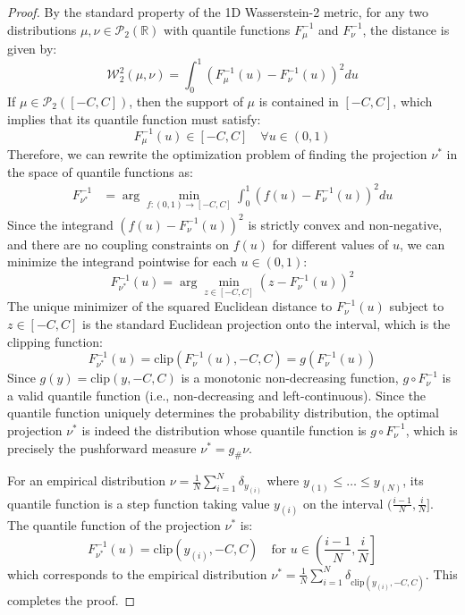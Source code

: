 \documentclass{article}
\theoremstyle{plain}
\theoremstyle{definition}
\theoremstyle{remark}
\begin{document}
\begin{proof}
By the standard property of the 1D Wasserstein-2 metric, for any two distributions $\mu, \nu \in \mathcal{P}_2(\mathbb{R})$ with quantile functions $F_{\mu}^{-1}$ and $F_{\nu}^{-1}$, the distance is given by:
\begin{equation}
    \mathcal{W}_2^2(\mu, \nu) = \int_{0}^{1} \left( F_{\mu}^{-1}(u) - F_{\nu}^{-1}(u) \right)^2 du
\end{equation}
If $\mu \in \mathcal{P}_2([-C, C])$, then the support of $\mu$ is contained in $[-C, C]$, which implies that its quantile function must satisfy:
\begin{equation}
    F_{\mu}^{-1}(u) \in [-C, C] \quad \forall u \in (0, 1)
\end{equation}
Therefore, we can rewrite the optimization problem of finding the projection $\nu^*$ in the space of quantile functions as:
\begin{align}
    F_{\nu^*}^{-1} &= \arg\min_{f : (0, 1) \to [-C, C]} \int_{0}^{1} \left( f(u) - F_{\nu}^{-1}(u) \right)^2 du
\end{align}
Since the integrand $\left( f(u) - F_{\nu}^{-1}(u) \right)^2$ is strictly convex and non-negative, and there are no coupling constraints on $f(u)$ for different values of $u$, we can minimize the integrand pointwise for each $u \in (0, 1)$:
\begin{equation}
    F_{\nu^*}^{-1}(u) = \arg\min_{z \in [-C, C]} \left( z - F_{\nu}^{-1}(u) \right)^2
\end{equation}
The unique minimizer of the squared Euclidean distance to $F_{\nu}^{-1}(u)$ subject to $z \in [-C, C]$ is the standard Euclidean projection onto the interval, which is the clipping function:
\begin{equation}
    F_{\nu^*}^{-1}(u) = \text{clip}\left( F_{\nu}^{-1}(u), -C, C \right) = g\left( F_{\nu}^{-1}(u) \right)
\end{equation}
Since $g(y) = \text{clip}(y, -C, C)$ is a monotonic non-decreasing function, $g \circ F_{\nu}^{-1}$ is a valid quantile function (i.e., non-decreasing and left-continuous). Since the quantile function uniquely determines the probability distribution, the optimal projection $\nu^*$ is indeed the distribution whose quantile function is $g \circ F_{\nu}^{-1}$, which is precisely the pushforward measure $\nu^* = g_{\#} \nu$. 

For an empirical distribution $\nu = \frac{1}{N} \sum_{i=1}^N \delta_{y_{(i)}}$ where $y_{(1)} \le \dots \le y_{(N)}$, its quantile function is a step function taking value $y_{(i)}$ on the interval $(\frac{i-1}{N}, \frac{i}{N}]$. The quantile function of the projection $\nu^*$ is:
\begin{equation}
    F_{\nu^*}^{-1}(u) = \text{clip}\left( y_{(i)}, -C, C \right) \quad \text{for } u \in \left( \frac{i-1}{N}, \frac{i}{N} \right]
\end{equation}
which corresponds to the empirical distribution $\nu^* = \frac{1}{N} \sum_{i=1}^N \delta_{\text{clip}(y_{(i)}, -C, C)}$. This completes the proof.
\end{proof}
\end{document}
